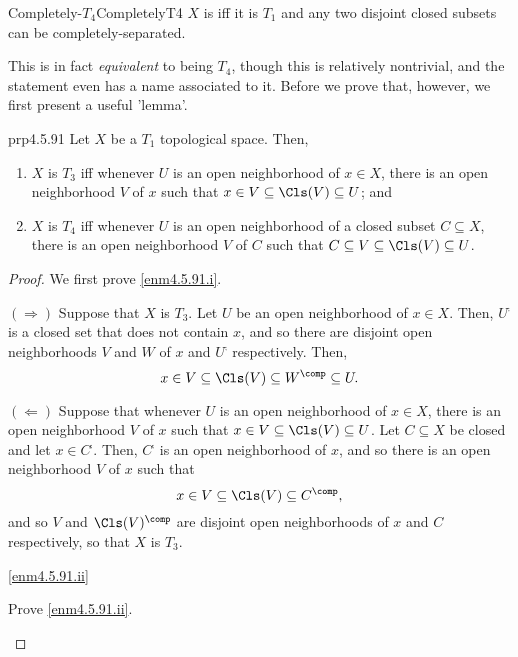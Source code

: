\begin{dfn}{Completely-$T_4$}{CompletelyT4}
$X$ is  iff it is $T_1$ and any two disjoint closed subsets can be completely-separated.
\end{dfn}
This is in fact \emph{equivalent} to being $T_4$, though this is relatively nontrivial, and the statement even has a name associated to it.  Before we prove that, however, we first present a useful 'lemma'.
\begin{prp}{}{prp4.5.91}
Let $X$ be a $T_1$ topological space.  Then,
\begin{enumerate}
\item \label{enm4.5.91.i}$X$ is $T_3$ iff whenever $U$ is an open neighborhood of $x\in X$, there is an open neighborhood $V$ of $x$ such that $x\in V\subseteq \Cls (V)\subseteq U$; and
\item \label{enm4.5.91.ii}$X$ is $T_4$ iff whenever $U$ is an open neighborhood of a closed subset $C\subseteq X$, there is an open neighborhood $V$ of $C$ such that $C\subseteq V\subseteq \Cls (V)\subseteq U$.
\end{enumerate}
\begin{proof}
We first prove \cref{enm4.5.91.i}.

$(\Rightarrow )$ Suppose that $X$ is $T_3$.  Let $U$ be an open neighborhood of $x\in X$.  Then, $U^{\comp}$ is a closed set that does not contain $x$, and so there are disjoint open neighborhoods $V$ and $W$ of $x$ and $U^{\comp}$ respectively.  Then,
\begin{equation}
x\in V\subseteq \Cls (V)\subseteq W^{\comp}\subseteq U.
\end{equation}

\blankline
\noindent
$(\Leftarrow )$ Suppose that whenever $U$ is an open neighborhood of $x\in X$, there is an open neighborhood $V$ of $x$ such that $x\in V\subseteq \Cls (V)\subseteq U$.  Let $C\subseteq X$ be closed and let $x\in C^{\comp}$.  Then, $C^{\comp}$ is an open neighborhood of $x$, and so there is an open neighborhood $V$ of $x$ such that
\begin{equation}
x\in V\subseteq \Cls (V)\subseteq C^{\comp},
\end{equation}
and so $V$ and $\Cls (V)^{\comp}$ are disjoint open neighborhoods of $x$ and $C$ respectively, so that $X$ is $T_3$.

\blankline
\noindent
\cref{enm4.5.91.ii}
\begin{exr}[breakable=false]{}{}
Prove \cref{enm4.5.91.ii}.
\end{exr}
\end{proof}
\end{prp}
